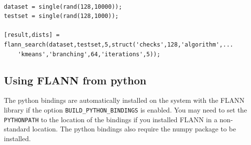 \documentclass[letter,10pt]{article}
\begin{document}
\begin{Verbatim}[fontsize=\footnotesize,frame=single]

dataset = single(rand(128,10000));
testset = single(rand(128,1000));

[result,dists] = flann_search(dataset,testset,5,struct('checks',128,'algorithm',...
    'kmeans','branching',64,'iterations',5));

\end{Verbatim}



\subsection{Using FLANN from python}

The python bindings are automatically installed on the system with the FLANN library
if the option \texttt{BUILD\_PYTHON\_BINDINGS} is enabled. You may need to set the 
\texttt{PYTHONPATH} to the location of the bindings if you installed FLANN in a
non-standard location. The python bindings also require the numpy package to be installed.
\end{document}
